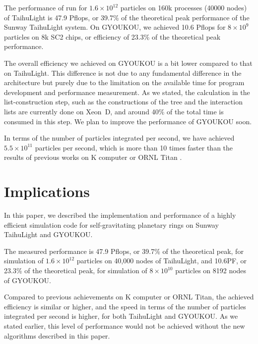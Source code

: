 \documentclass[conference]{IEEEtran}
\begin{document}
The performance of run for $1.6\times 10^{12}$ particles on 160k
processes (40000 nodes) of TaihuLight is 47.9 Pflops, or 39.7\% of the
theoretical peak performance of the Sunway TaihuLight system.  On
GYOUKOU, we achieved 10.6 Pflops for $8\times 10^{9}$ particles on 8k SC2
chips, or efficiency of 23.3\% of the theoretical peak performance.

The overall efficiency we achieved on GYOUKOU is a bit lower compared
to that on TaihuLight. This difference is not due to any fundamental
difference in the architecture but purely due to the limitation on the
available time for program development and performance measurement. As
we stated, the calculation in the list-construction step, such as
the constructions of the tree and the interaction lists are currently
done on Xeon~D, and around 40\% of the total time is consumed in this
step. We plan to improve the performance of GYOUKOU soon.

 In terms of the number of
particles integrated per second, we have achieved $5.5\times
10^{11}$ particles per second, which is more than 10 times faster than
the results of previous works on
K computer\cite{Ishiyamaetal2012} or ORNL Titan
\cite{Bedorfetal2014}.


\section{Implications}


In this paper, we described the implementation and performance of
a highly efficient simulation code for self-gravitating planetary
rings on  Sunway TaihuLight and GYOUKOU.

The measured performance is 47.9 Pflops, or 39.7\% of the theoretical
peak, for simulation of $1.6\times 10^{12}$ particles on 40,000 nodes
of TaihuLight, and 10.6PF, or 23.3\% of the theoretical peak, for
simulation of $8\times 10^{10}$ particles on 8192 nodes of GYOUKOU.

Compared to previous achievements on K computer or ORNL Titan, the
achieved efficiency is similar or higher, and the speed in terms of
the number of particles integrated per second is higher, for both
TaihuLight and GYOUKOU. As we stated earlier, this level of
performance would not be achieved without the new algorithms described in
this paper. 
\end{document}
